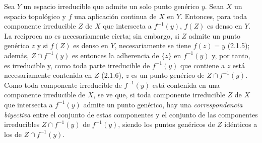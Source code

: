 \begin{env}[2.1.8]
\label{0.2.1.8-fr}
Sea $Y$ un espacio irreducible que admite un solo punto genérico $y$. Sean
$X$ un espacio topológico y $f$ una aplicación continua de $X$ en $Y$.
Entonces, para toda componente irreducible $Z$ de $X$ que intersecta a $f^{-1}(y)$,
$f(Z)$ es denso en $Y$. La recíproca no es necesariamente cierta;
sin embargo, si $Z$ admite un punto genérico $z$ y si $f(Z)$ es denso en
$Y$, necesariamente se tiene $f(z)=y$ (2.1.5); además, $Z\cap f^{-1}(y)$ es
entonces la adherencia de $\{z\}$ en $f^{-1}(y)$ y, por tanto, es irreducible y,
como toda parte irreducible de $f^{-1}(y)$ que contiene a $z$ está
necesariamente contenida en $Z$ (2.1.6), $z$ es un punto genérico de
$Z\cap f^{-1}(y)$. Como toda componente irreducible de $f^{-1}(y)$ está
contenida en una componente irreducible de $X$, se ve que, si toda
componente irreducible $Z$ de $X$ que intersecta a $f^{-1}(y)$ admite un punto
genérico, hay una \emph{correspondencia biyectiva} entre el conjunto de
estas componentes y el conjunto de las componentes irreducibles
$Z\cap f^{-1}(y)$ de $f^{-1}(y)$, siendo los puntos genéricos de $Z$
idénticos a los de $Z\cap f^{-1}(y)$.
\end{env}
